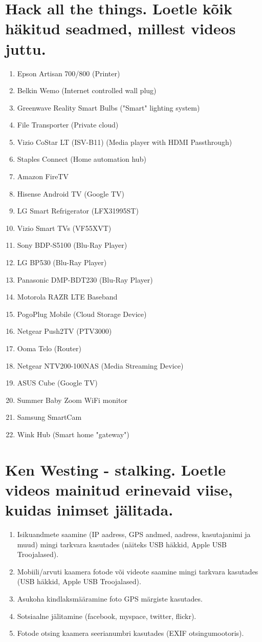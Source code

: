 \documentclass{article}
\begin{document}
\begin{enumerate}
\section{Hack all the things. Loetle kõik häkitud seadmed, millest videos juttu.}
\begin{enumerate}
	\item{Epson Artisan 700/800 (Printer)}
	\item{Belkin Wemo (Internet controlled wall plug)}
	\item{Greenwave Reality Smart Bulbs ("Smart" lighting system)}
	\item{File Transporter (Private cloud)}
	\item{Vizio CoStar LT (ISV-B11) (Media player with HDMI Passthrough)}
	\item{Staples Connect (Home automation hub)}
	\item{Amazon FireTV}
	\item{Hisense Android TV (Google TV)}
	\item{LG Smart Refrigerator (LFX31995ST)}
	\item{Vizio Smart TVs (VF55XVT)}
	\item{Sony BDP-S5100 (Blu-Ray Player)}
	\item{LG BP530 (Blu-Ray Player)}
	\item{Panasonic DMP-BDT230 (Blu-Ray Player)}
	\item{Motorola RAZR LTE Baseband}
	\item{PogoPlug Mobile (Cloud Storage Device)}
	\item{Netgear Push2TV (PTV3000)}
	\item{Ooma Telo (Router)}
	\item{Netgear NTV200-100NAS (Media Streaming Device)}
	\item{ASUS Cube (Google TV)}
	\item{Summer Baby Zoom WiFi monitor}
	\item{Samsung SmartCam}
	\item{Wink Hub (Smart home "gateway")}
\end{enumerate}

\section{Ken Westing - stalking. Loetle videos mainitud erinevaid viise, kuidas inimset jälitada.}
\begin{enumerate}
	\item{Isikuandmete saamine (IP aadress,  GPS andmed, aadress, kasutajanimi ja muud) mingi tarkvara kasutades (näiteks USB häkkid, Apple USB Troojalased).}
	\item{Mobiili/arvuti kaamera fotode või videote saamine mingi tarkvara kasutades (USB häkkid, Apple USB Troojalased).}
	\item{Asukoha kindlaksmääramine foto GPS märgiste kasutades.}
	\item{Sotsiaalne jälitamine (facebook, myspace, twitter, flickr).}
	\item{Fotode otsing kaamera seerianumbri kasutades (EXIF otsingumootoris).}
\end{enumerate}


\end{enumerate}
\end{document}
